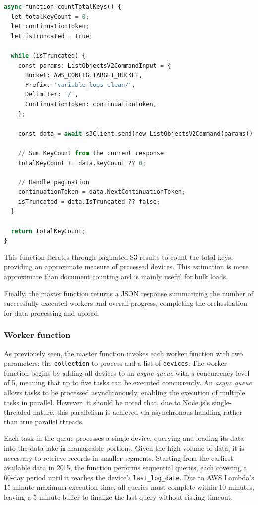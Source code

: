 \begin{lstlisting}[language=Python, caption=\texttt{countTotalKeys} function]
async function countTotalKeys() {
  let totalKeyCount = 0;
  let continuationToken;
  let isTruncated = true;

  while (isTruncated) {
    const params: ListObjectsV2CommandInput = {
      Bucket: AWS_CONFIG.TARGET_BUCKET,
      Prefix: 'variable_logs_clean/',
      Delimiter: '/',
      ContinuationToken: continuationToken,
    };

    const data = await s3Client.send(new ListObjectsV2Command(params));

    // Sum KeyCount from the current response
    totalKeyCount += data.KeyCount ?? 0;

    // Handle pagination
    continuationToken = data.NextContinuationToken;
    isTruncated = data.IsTruncated ?? false;
  }

  return totalKeyCount;
}
\end{lstlisting}

This function iterates through paginated \ac{S3} results to count the total keys, providing an approximate measure of processed devices. This estimation is more approximate than document counting and is mainly useful for bulk loads.

Finally, the master function returns a \ac{JSON} response summarizing the number of successfully executed workers and overall progress, completing the orchestration for data processing and upload.

\subsubsection{Worker function}

As previously seen, the master function invokes each worker function with two parameters: the \texttt{collection} to process and a list of \texttt{devices}. The worker function begins by adding all devices to an \textit{async queue} with a concurrency level of 5, meaning that up to five tasks can be executed concurrently. An \textit{async queue} allows tasks to be processed asynchronously, enabling the execution of multiple tasks in parallel. However, it should be noted that, due to Node.js's single-threaded nature, this parallelism is achieved via asynchronous handling rather than true parallel threads.

Each task in the queue processes a single device, querying and loading its data into the data lake in manageable portions. Given the high volume of data, it is necessary to retrieve records in smaller segments. Starting from the earliest available data in 2015, the function performs sequential queries, each covering a 60-day period until it reaches the device's \texttt{last\_log\_date}. Due to \ac{AWS} Lambda's 15-minute maximum execution time, all queries must complete within 10 minutes, leaving a 5-minute buffer to finalize the last query without risking timeout.

